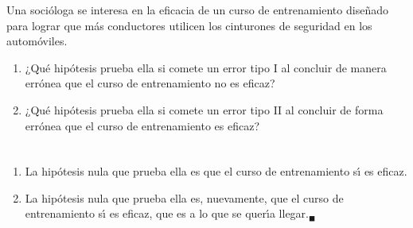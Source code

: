 \begin{enunciado}
 Una soci\'ologa se interesa en la eficacia de un curso de entrenamiento dise\~nado para lograr que m\'as conductores utilicen los cinturones de seguridad en los autom\'oviles.
 \begin{enumerate}
  \item ¿Qu\'e hip\'otesis prueba ella si comete un error tipo I al concluir de manera err\'onea que el curso de entrenamiento no es eficaz?
  
  \item ¿Qu\'e hip\'otesis prueba ella si comete un error tipo II al concluir de forma err\'onea que el curso de entrenamiento es eficaz?
 \end{enumerate}
\end{enunciado}

\begin{solucion}
 $\phantom{0}$
 \begin{enumerate}
  \item La hip\'otesis nula que prueba ella es que el curso de entrenamiento s\'{\i} es eficaz.
  
  \item La hip\'otesis nula que prueba ella es, nuevamente, que el curso de entrenamiento s\'{\i} es eficaz, que es a lo que se quer\'{\i}a llegar.${}_{\blacksquare}$
 \end{enumerate}
\end{solucion}
